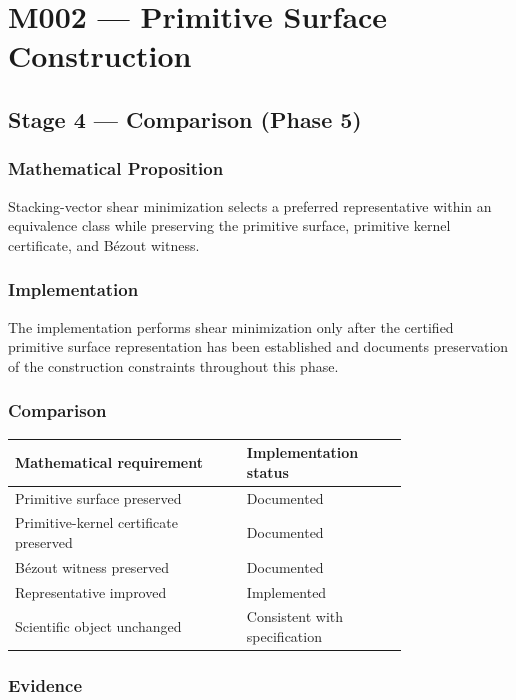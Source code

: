 
\chapter{M002 --- Primitive Surface Construction}

\section{Stage 4 --- Comparison (Phase 5)}

\subsection{Mathematical Proposition}

Stacking-vector shear minimization selects a preferred representative
within an equivalence class while preserving the primitive surface,
primitive kernel certificate, and Bézout witness.

\subsection{Implementation}

The implementation performs shear minimization only after the certified
primitive surface representation has been established and documents
preservation of the construction constraints throughout this phase.

\subsection{Comparison}

\begin{center}
\begin{tabular}{|p{0.46\linewidth}|p{0.32\linewidth}|}
\hline
Mathematical requirement & Implementation status\\
\hline
Primitive surface preserved & Documented\\
Primitive-kernel certificate preserved & Documented\\
Bézout witness preserved & Documented\\
Representative improved & Implemented\\
Scientific object unchanged & Consistent with specification\\
\hline
\end{tabular}
\end{center}

\subsection{Evidence}

